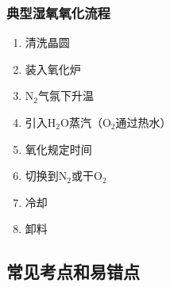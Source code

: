 \documentclass[UTF8,12pt,a4paper]{ctexart}
\begin{document}
\subsubsection{典型湿氧氧化流程}

\begin{enumerate}
    \item 清洗晶圆
    \item 装入氧化炉
    \item N$_2$气氛下升温
    \item 引入H$_2$O蒸汽（O$_2$通过热水）
    \item 氧化规定时间
    \item 切换到N$_2$或干O$_2$
    \item 冷却
    \item 卸料
\end{enumerate}

\subsection{常见考点和易错点}
\end{document}
